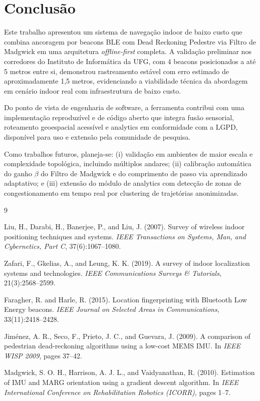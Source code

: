 \documentclass[12pt]{article}
\begin{document}
\section{Conclusão}

Este trabalho apresentou um sistema de navegação indoor de baixo custo que combina
ancoragem por beacons BLE com Dead Reckoning Pedestre via Filtro de Madgwick em
uma arquitetura \textit{offline-first} completa. A validação preliminar nos corredores
do Instituto de Informática da UFG, com 4 beacons posicionados a até 5 metros entre
si, demonstrou rastreamento estável com erro estimado de aproximadamente 1,5 metros,
evidenciando a viabilidade técnica da abordagem em cenário indoor real com
infraestrutura de baixo custo.

Do ponto de vista de engenharia de software, a ferramenta contribui com uma
implementação reproduzível e de código aberto que integra fusão sensorial, roteamento
geoespacial acessível e analytics em conformidade com a LGPD, disponível para
uso e extensão pela comunidade de pesquisa.

Como trabalhos futuros, planeja-se: (i) validação em ambientes de maior escala e
complexidade topológica, incluindo múltiplos andares; (ii) calibração automática
do ganho $\beta$ do Filtro de Madgwick e do comprimento de passo via aprendizado
adaptativo; e (iii) extensão do módulo de analytics com detecção de zonas de
congestionamento em tempo real por clustering de trajetórias anonimizadas.


\begin{thebibliography}{9}

Liu, H., Darabi, H., Banerjee, P., and Liu, J. (2007).
Survey of wireless indoor positioning techniques and systems.
\textit{IEEE Transactions on Systems, Man, and Cybernetics, Part C},
37(6):1067--1080.

Zafari, F., Gkelias, A., and Leung, K. K. (2019).
A survey of indoor localization systems and technologies.
\textit{IEEE Communications Surveys \& Tutorials}, 21(3):2568--2599.

Faragher, R. and Harle, R. (2015).
Location fingerprinting with Bluetooth Low Energy beacons.
\textit{IEEE Journal on Selected Areas in Communications}, 33(11):2418--2428.

Jiménez, A. R., Seco, F., Prieto, J. C., and Guevara, J. (2009).
A comparison of pedestrian dead-reckoning algorithms using a low-cost MEMS IMU.
In \textit{IEEE WISP 2009}, pages 37--42.

Madgwick, S. O. H., Harrison, A. J. L., and Vaidyanathan, R. (2010).
Estimation of IMU and MARG orientation using a gradient descent algorithm.
In \textit{IEEE International Conference on Rehabilitation Robotics (ICORR)},
pages 1--7.

\end{thebibliography}
\end{document}
